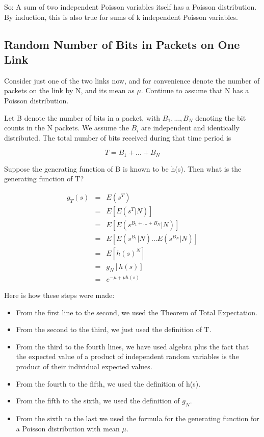 So:  A sum of two independent Poisson variables itself has a Poisson
distribution.  By induction, this is also true for sums of k independent
Poisson variables.

\subsection{Random Number of Bits in Packets on One Link}
\label{randomn}

Consider just one of the two links now, and for convenience denote the
number of packets on the link by N, and its mean as $\mu$.  Continue to
assume that N has a Poisson distribution.

Let B denote the number of bits in a packet, with $B_1,...,B_N$ denoting
the bit counts in the N packets.  We assume the $B_i$ are independent
and identically distributed. The total number of bits received during
that time period is

\begin{equation}
T=B_1+...+B_N
\end{equation}

Suppose the generating function of B is known to be h(s). Then what is
the generating function of T?

\begin{eqnarray}
g_T(s) & = & E(s^{T})\\
 & = & E[E(s^{T}|N)]\\
 & = & E[E(s^{B_1+...+B_N}|N)]\\
 & = & E[E(s^{B_1}|N)...E(s^{B_N}|N)]\\
 & = & E[h(s)^{N}]\\
 & = & g_N[h(s)]\\
 & = & e^{-\mu+\mu h(s)}
\end{eqnarray}  

Here is how these steps were made: 

\begin{itemize}

\item From the first line to the second, we used
the Theorem of Total Expectation. 

\item From the second to the third, we just used the definition of T.

\item From the third to the fourth lines, we have used algebra plus the
fact that the expected value of a product of independent random
variables is the product of their individual expected
values.

\item From the fourth to the fifth, we used the definition of h(s).

\item From the fifth to the sixth, we used the definition of $g_N$.

\item From the sixth to the last we used the formula for the generating
function for a Poisson distribution with mean $\mu$.

\end{itemize}

